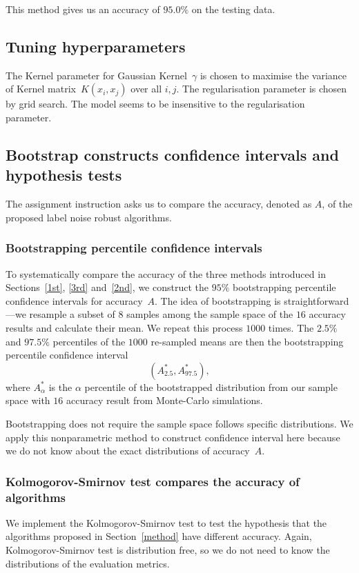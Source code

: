 \documentclass[12pt]{article} %
\begin{document}
This method gives us an accuracy of $95.0\%$ on the testing data.


\subsection{Tuning hyperparameters}
The Kernel parameter for Gaussian Kernel~$\gamma$ is chosen to maximise the variance of Kernel matrix~$K(x_i,x_j)$ over all $i,j$. The regularisation parameter is chosen by grid search. The model seems to be insensitive to the regularisation parameter.

\subsection{Bootstrap constructs confidence intervals and hypothesis tests}\label{ci}
The assignment instruction asks us to compare the accuracy, denoted as $A$, of the proposed label noise robust algorithms. 
\subsubsection{Bootstrapping percentile confidence intervals}\label{ci}
To systematically compare the accuracy of the three methods introduced in Sections~\ref{1st}, \ref{3rd} and~\ref{2nd}, we construct the $95\%$ bootstrapping percentile confidence intervals for accuracy~$A$. The idea of bootstrapping  is straightforward---we resample a subset of $8$ samples among the sample space of the $16$ accuracy results and calculate their mean. We repeat this process $1000$ times. The $2.5\%$ and $97.5\%$ percentiles of the $1000$ re-sampled means are then the bootstrapping percentile confidence interval
\begin{equation}
({A}^*_{2.5}, {A}^*_{97.5}), \label{eq:boot}
\end{equation}
where $A^*_{\alpha}$ is the $\alpha$ percentile of the bootstrapped distribution from our sample space with $16$ accuracy result from Monte-Carlo simulations.

Bootstrapping does not require the sample space follows specific distributions. We apply this nonparametric method to construct confidence interval here because we do not know about the exact distributions of accuracy~$A$.

\subsubsection{Kolmogorov-Smirnov test compares the accuracy of algorithms}
We implement the Kolmogorov-Smirnov test to test the hypothesis that the algorithms proposed in Section~\ref{method} have different accuracy.  Again, Kolmogorov-Smirnov test is distribution free, so we do not need to know the distributions of the evaluation metrics.
\end{document}
